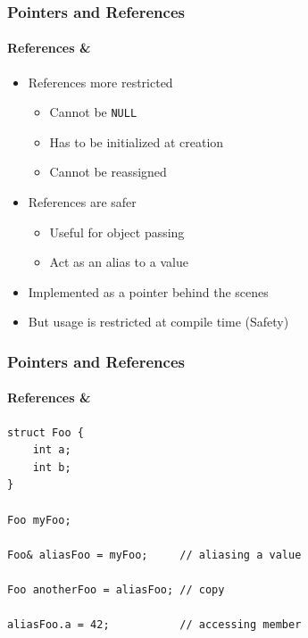 \documentclass[table]{beamer}
\newcommand{\declarelesson}{\textbf{\color{themegreen}{Lesson:}} }
\begin{document}
\begin{frame}
    \frametitle{\declarelesson Pointers and References}
    \framesubtitle{References \&}
    \begin{itemize}
        \item References more restricted
            \begin{itemize}
                \item Cannot be \texttt{NULL}
                \item Has to be initialized at creation
                \item Cannot be reassigned
            \end{itemize}
        \item References are safer
            \begin{itemize}
                \item Useful for object passing
                \item Act as an alias to a value
            \end{itemize}
        \item Implemented as a pointer behind the scenes
        \item But usage is restricted at compile time (\alert{Safety})
    \end{itemize}
\end{frame}

\begin{frame}[fragile]
    \frametitle{\declarelesson Pointers and References}
    \framesubtitle{References \&}
    \begin{lstlisting}[title=Reference Usage]
struct Foo {
    int a;
    int b;
}

Foo myFoo;

Foo& aliasFoo = myFoo;     // aliasing a value

Foo anotherFoo = aliasFoo; // copy

aliasFoo.a = 42;           // accessing member
    \end{lstlisting}
\end{frame}
\end{document}

